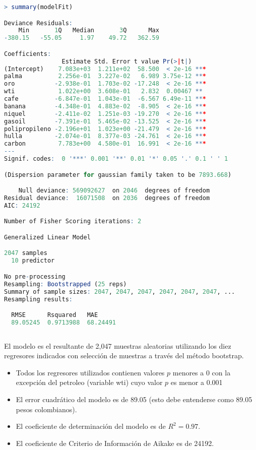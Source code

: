\begin{lstlisting}[language=R]  
> summary(modelFit)

Deviance Residuals: 
    Min       1Q   Median       3Q      Max  
-380.15   -55.05     1.97    49.72   362.59  

Coefficients:
                Estimate Std. Error t value Pr(>|t|)    
(Intercept)    7.083e+03  1.211e+02  58.500  < 2e-16 ***
palma          2.256e-01  3.227e-02   6.989 3.75e-12 ***
oro           -2.938e-01  1.703e-02 -17.248  < 2e-16 ***
wti            1.022e+00  3.608e-01   2.832  0.00467 ** 
cafe          -6.847e-01  1.043e-01  -6.567 6.49e-11 ***
banana        -4.348e-01  4.883e-02  -8.905  < 2e-16 ***
niquel        -2.411e-02  1.251e-03 -19.270  < 2e-16 ***
gasoil        -7.391e-01  5.465e-02 -13.525  < 2e-16 ***
polipropileno -2.196e+01  1.023e+00 -21.479  < 2e-16 ***
hulla         -2.074e-01  8.377e-03 -24.761  < 2e-16 ***
carbon         7.783e+00  4.580e-01  16.991  < 2e-16 ***
---
Signif. codes:  0 '***' 0.001 '**' 0.01 '*' 0.05 '.' 0.1 ' ' 1

(Dispersion parameter for gaussian family taken to be 7893.668)

    Null deviance: 569092627  on 2046  degrees of freedom
Residual deviance:  16071508  on 2036  degrees of freedom
AIC: 24192

Number of Fisher Scoring iterations: 2

Generalized Linear Model 

2047 samples
  10 predictor

No pre-processing
Resampling: Bootstrapped (25 reps) 
Summary of sample sizes: 2047, 2047, 2047, 2047, 2047, 2047, ... 
Resampling results:

  RMSE      Rsquared   MAE     
  89.05245  0.9713988  68.24491
  
\end{lstlisting}

El modelo es el resultante de 2,047 muestras aleatorias utilizando los diez regresores indicados con selección de muestras a través del método bootstrap. 

\begin{itemize}
  \item Todos los regresores utilizados contienen valores $p$ menores a 0 con la excepción del petroleo (variable wti) cuyo valor $p$ es menor a 0.001
  \item El error cuadrático del modelo es de 89.05 (esto debe entenderse como 89.05 pesos colombianos).
  \item El coeficiente de determinación del modelo es de $R^2 = 0.97$.
  \item El coeficiente de Criterio de Información de Aikake es de 24192.
\end{itemize}

